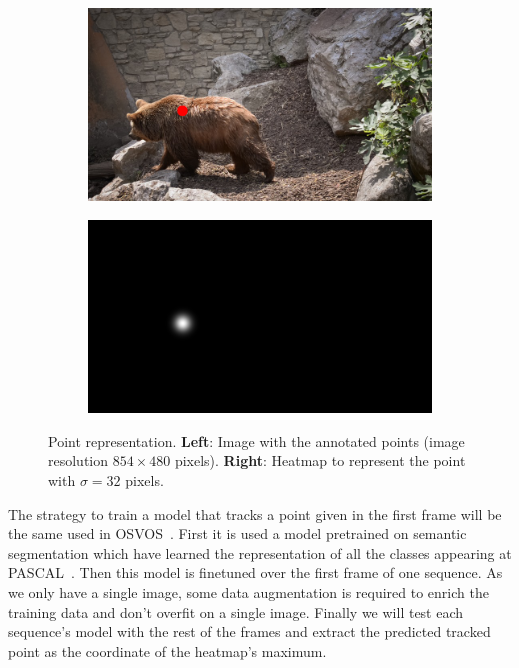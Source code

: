 \begin{figure}[h]
  \centering
  \begin{subfigure}{.5\textwidth}
    \centering
    \includegraphics[width=.8\linewidth]{figures/methods/heatmaps/image_point.png}
  \end{subfigure}%
  \begin{subfigure}{.5\textwidth}
    \centering
    \includegraphics[width=.8\linewidth]{figures/methods/heatmaps/heatmap.png}
  \end{subfigure}
  \caption{
  Point representation.
  \textbf{Left}: Image with the annotated points (image resolution $854 \times 480$ pixels).
  \textbf{Right}: Heatmap to represent the point with $\sigma = 32$ pixels. }
  \label{fig:tracking:pointrepresentation}
\end{figure}

The strategy to train a model that tracks a point given in the first frame will be the same used in OSVOS~\osvos{}.
First it is used a model pretrained on semantic segmentation which have learned the representation of all the classes appearing at PASCAL~\pascal{}.
Then this model is finetuned over the first frame of one sequence.
As we only have a single image, some data augmentation is required to enrich the training data and don't overfit on a single image.
Finally we will test each sequence's model with the rest of the frames and extract the predicted tracked point as the coordinate of the heatmap's maximum.

